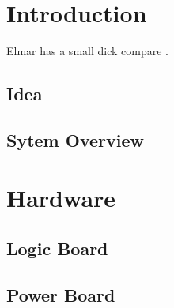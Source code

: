 \documentclass{report}
\begin{document}



\pagestyle{fancy}

\tableofcontents
\listoffigures
\newpage
\listoftables

\newpage
\setcounter{roman}{\value{page}}
\setcounter{page}{1}

\chapter{Introduction}
\label{chap:intro}
Elmar has a small dick compare \cite{microsemi:igloo2_site}.
\section{Idea}
\label{sec:idea}

\section{Sytem Overview}
\label{sec:system}


\chapter{Hardware}
\label{chap:hardware}
\section{Logic Board}
\label{sec:logic}

\section{Power Board}
\label{sec:power}

\end{document}
